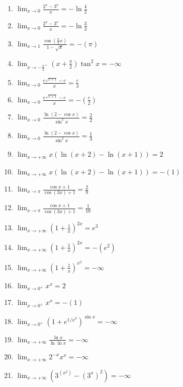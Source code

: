 \documentclass[11pt,a4paper]{article}
\begin{document}
\begin{enumerate}
\item $\displaystyle \lim_{x \to 0} \frac{2^{x} - 3^{x}}{x} = -\ln\frac{4}{2}$
\item $\displaystyle \lim_{x \to 0} \frac{2^{x} - 3^{x}}{x} = -\ln\frac{3}{3}$
\item $\displaystyle \lim_{x \to 1} \frac{\cos\left(\frac{\pi}{2}x\right)}{1 - \sqrt{x}} = -\left(\pi\right)$
\item $\displaystyle \lim_{x \to -\frac{\pi}{2}^{+}} \left(x + \frac{\pi}{2}\right)\tan^{2} x = -\infty$
\item $\displaystyle \lim_{x \to 0} \frac{e^{\sqrt{x + 1}} - e}{x} = \frac{e}{3}$
\item $\displaystyle \lim_{x \to 0} \frac{e^{\sqrt{x + 1}} - e}{x} = -\left(\frac{e}{2}\right)$
\item $\displaystyle \lim_{x \to 0} \frac{\ln(2 - \cos x)}{\sin^{2} x} = \frac{2}{2}$
\item $\displaystyle \lim_{x \to 0} \frac{\ln(2 - \cos x)}{\sin^{2} x} = \frac{1}{3}$
\item $\displaystyle \lim_{x \to +\infty} x(\ln(x + 2) - \ln(x + 1)) = 2$
\item $\displaystyle \lim_{x \to +\infty} x(\ln(x + 2) - \ln(x + 1)) = -\left(1\right)$
\item $\displaystyle \lim_{x \to \pi} \frac{\cos x + 1}{\cos(3x) + 1} = \frac{2}{9}$
\item $\displaystyle \lim_{x \to \pi} \frac{\cos x + 1}{\cos(3x) + 1} = \frac{1}{10}$
\item $\displaystyle \lim_{x \to +\infty} \left(1 + \frac{1}{x}\right)^{2x} = e^{3}$
\item $\displaystyle \lim_{x \to +\infty} \left(1 + \frac{1}{x}\right)^{2x} = -\left(e^{2}\right)$
\item $\displaystyle \lim_{x \to +\infty} \left(1 + \frac{1}{x}\right)^{x^{2}} = -\infty$
\item $\displaystyle \lim_{x \to 0^{+}} x^{x} = 2$
\item $\displaystyle \lim_{x \to 0^{+}} x^{x} = -\left(1\right)$
\item $\displaystyle \lim_{x \to 0^{+}} \left(1 + e^{1/x^{3}}\right)^{\sin x} = -\infty$
\item $\displaystyle \lim_{x \to +\infty} \frac{\ln x}{\ln\ln x} = -\infty$
\item $\displaystyle \lim_{x \to +\infty} 2^{-x}x^{x} = -\infty$
\item $\displaystyle \lim_{x \to +\infty} \left(3^{(x^{2})} - (3^{x})^{2}\right) = -\infty$

\end{enumerate}
\end{document}
